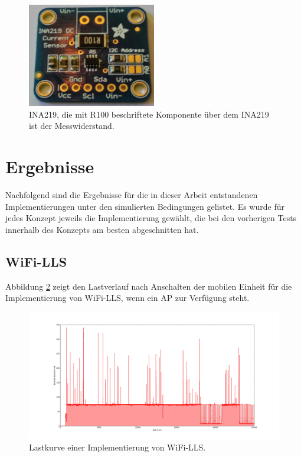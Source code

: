 \begin{figure}[h!]
  \centering
	\includegraphics[width=0.5\textwidth]{images/ina219.jpg}
  \caption{INA219, die mit R100 beschriftete Komponente über dem INA219 ist der Messwiderstand.}
  \label{fig:ina219}
\end{figure}

\section{Ergebnisse}
Nachfolgend sind die Ergebnisse für die in dieser Arbeit entstandenen Implementierungen unter den simulierten Bedingungen gelistet.
Es wurde für jedes Konzept jeweils die Implementierung gewählt, die bei den vorherigen Tests innerhalb des Konzepts am besten abgeschnitten hat.\\

\subsection{WiFi-LLS}
\label{ch:realworld:sec:wifills}
Abbildung \ref{fig:wifills} zeigt den Lastverlauf nach Anschalten der mobilen Einheit für die Implementierung von WiFi-LLS, wenn ein AP zur Verfügung steht. 

\begin{figure}[h!]
  \centering
	\includegraphics[width=\textwidth]{plots/wifills.png}
  \caption{Lastkurve einer Implementierung von WiFi-LLS.}
  \label{fig:wifills}
\end{figure}

